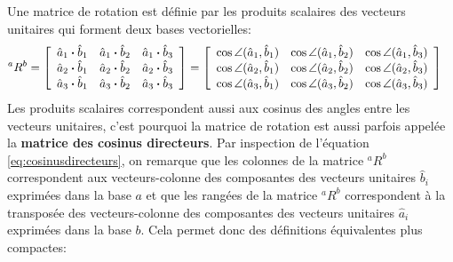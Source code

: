 Une matrice de rotation est définie par les produits scalaires des vecteurs unitaires qui forment deux bases vectorielles:
\begin{align}
{}^aR^b &=
\left[ \begin{array}{c c c}
		   \hat{a}_1 \bullet \hat{b}_1  &  \hat{a}_1 \bullet \hat{b}_2  &  \hat{a}_1 \bullet \hat{b}_3 \\
		   \hat{a}_2 \bullet \hat{b}_1  &  \hat{a}_2 \bullet \hat{b}_2  &  \hat{a}_2 \bullet \hat{b}_3 \\
		   \hat{a}_3 \bullet \hat{b}_1  &  \hat{a}_3 \bullet \hat{b}_2  &  \hat{a}_3 \bullet \hat{b}_3
\end{array} \right]
=
\left[ \begin{array}{c c c}
		   \cos \angle (\hat{a}_1 , \hat{b}_1)  &  \cos \angle (\hat{a}_1 , \hat{b}_2)  &  \cos \angle (\hat{a}_1 , \hat{b}_3) \\
		   \cos \angle (\hat{a}_2 , \hat{b}_1)  &  \cos \angle (\hat{a}_2 , \hat{b}_2)  &  \cos \angle (\hat{a}_2 , \hat{b}_3) \\
		   \cos \angle (\hat{a}_3 , \hat{b}_1)  &  \cos \angle (\hat{a}_3 , \hat{b}_2)  &  \cos \angle (\hat{a}_3 , \hat{b}_3)
\end{array} \right]
\label{eq:cosinusdirecteurs}
\end{align}
Les produits scalaires correspondent aussi aux cosinus des angles entre les vecteurs unitaires, c'est pourquoi la matrice de rotation est aussi parfois appelée la \textbf{matrice des cosinus directeurs}. Par inspection de l'équation \eqref{eq:cosinusdirecteurs}, on remarque que les colonnes de la matrice ${}^aR^b$ correspondent aux vecteurs-colonne des composantes des vecteurs unitaires $\hat{b}_i$ exprimées dans la base $a$ et que les rangées de la matrice ${}^aR^b$ correspondent à la transposée des vecteurs-colonne des composantes des vecteurs unitaires $\hat{a}_i$ exprimées dans la base $b$. Cela permet donc des définitions équivalentes plus compactes:

